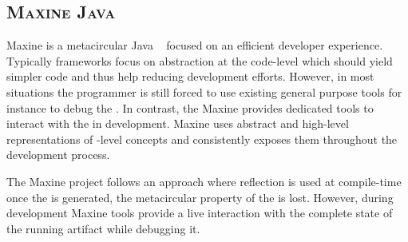 \subsection*{\textsc{Maxine Java \VM}}
Maxine is a metacircular Java \VM~\cite{Wimm13a} focused on an efficient developer experience.
Typically \VM frameworks focus on abstraction at the code-level which should yield simpler code and thus help reducing development efforts.
However, in most situations the programmer is still forced to use existing general purpose tools for instance to debug the \VM.
In contrast, the Maxine \VM provides dedicated tools to interact with the \VM in development.
Maxine uses abstract and high-level representations of \VM-level concepts and consistently exposes them throughout the development process.

The Maxine project follows an approach where reflection is used at compile-time \ie once the \VM is generated, the metacircular property of the \VM is lost. However, during development Maxine tools provide a live interaction with the complete state of the running \VM artifact while debugging it.

